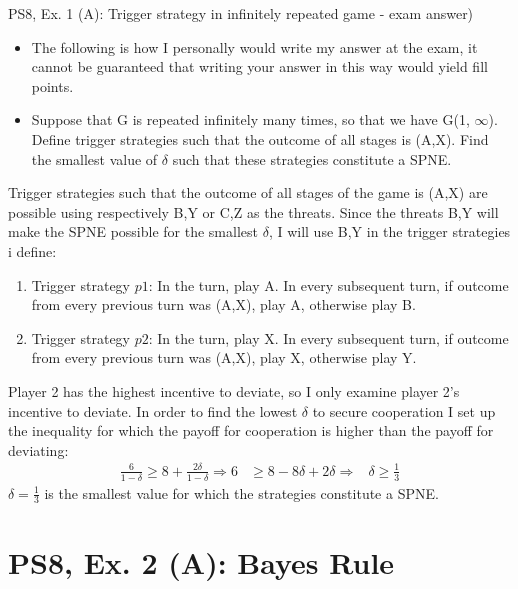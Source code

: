 \begin{frame}{PS8, Ex. 1 (A): Trigger strategy in infinitely repeated game - exam answer)}
    \begin{itemize}
        \item The following is how I personally would write my answer at the exam, it cannot be guaranteed that writing your answer in this way would yield fill points.
        \item[(a)] Suppose that G is repeated infinitely many times, so that we have G(1, $\infty$). Define trigger strategies such that the outcome of all stages is (A,X). Find the smallest value of $\delta$ such that these strategies constitute a SPNE.
    \end{itemize}
  \begin{multicols}{2}
  Trigger strategies such that the outcome of all stages of the game is (A,X) are possible using respectively B,Y or C,Z as the threats. Since the threats B,Y will make the SPNE possible for the smallest $\delta$, I will use B,Y in the trigger strategies i define: \\
    \begin{enumerate}
    \item Trigger strategy $p1$: In the  turn, play A. In every subsequent turn, if outcome from every previous turn was (A,X), play A, otherwise play B.
    \item Trigger strategy $p2$: In the  turn, play X. In every subsequent turn, if outcome from every previous turn was (A,X), play X, otherwise play Y.
    \end{enumerate}
    \vfill\null\columnbreak
    Player 2 has the highest incentive to deviate, so I only examine player 2's incentive to deviate. In order to find the lowest $\delta$ to secure cooperation I set up the inequality for which the payoff for cooperation is higher than the payoff for deviating:
    \begin{align*}
    \frac{6}{1-\delta} \geq 8 + \frac{2\delta}{1-\delta} \Rightarrow 6 & \geq 8 - 8\delta + 2\delta \Rightarrow & \delta \geq \frac{1}{3}
    \end{align*}
    $\delta=\frac{1}{3}$ is the smallest value for which the strategies constitute a SPNE.    
    \vfill\null
  \end{multicols}
\end{frame}

\section{PS8, Ex. 2 (A): Bayes Rule}


